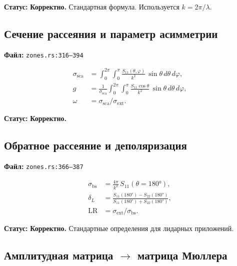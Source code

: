 \documentclass[12pt,a4paper]{article}
\begin{document}
\textbf{Статус:} \textcolor{green!50!black}{\textbf{Корректно.}}
Стандартная формула. Используется $k = 2\pi/\lambda$.

\subsection{Сечение рассеяния и параметр асимметрии}

\textbf{Файл:} \texttt{zones.rs:316--394}

\begin{align}
  \sigma_{\mathrm{sca}} &= \int_0^{2\pi}\!\!\int_0^{\pi}
    \frac{S_{11}(\theta,\varphi)}{k^2}\,\sin\theta\,d\theta\,d\varphi, \\
  g &= \frac{1}{\sigma_{\mathrm{sca}}}
    \int_0^{2\pi}\!\!\int_0^{\pi}
    \frac{S_{11}\cos\theta}{k^2}\,\sin\theta\,d\theta\,d\varphi, \\
  \omega &= \sigma_{\mathrm{sca}} / \sigma_{\mathrm{ext}}.
\end{align}

\textbf{Статус:} \textcolor{green!50!black}{\textbf{Корректно.}}

\subsection{Обратное рассеяние и деполяризация}

\textbf{Файл:} \texttt{zones.rs:366--387}

\begin{align}
  \sigma_{\mathrm{bs}} &= \frac{4\pi}{k^2}\, S_{11}(\theta = 180°), \\
  \delta_L &= \frac{S_{11}(180°) - S_{22}(180°)}{S_{11}(180°) + S_{22}(180°)}, \\
  \mathrm{LR} &= \sigma_{\mathrm{ext}} / \sigma_{\mathrm{bs}}.
\end{align}

\textbf{Статус:} \textcolor{green!50!black}{\textbf{Корректно.}}
Стандартные определения для лидарных приложений.

\subsection{Амплитудная матрица $\to$ матрица Мюллера}
\end{document}
